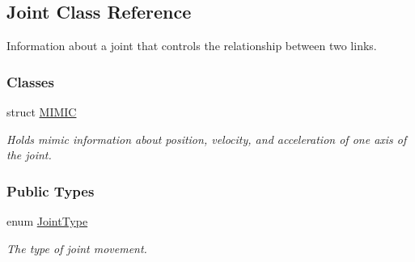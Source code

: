 \hypertarget{classOpenRAVE_1_1KinBody_1_1Joint}{
\subsection{Joint Class Reference}
\label{classOpenRAVE_1_1KinBody_1_1Joint}
}


Information about a joint that controls the relationship between two links.  


\subsubsection*{Classes}
\begin{DoxyCompactItemize}
\item 
struct \hyperlink{structOpenRAVE_1_1KinBody_1_1Joint_1_1MIMIC}{MIMIC}
\begin{DoxyCompactList}\small\item\em Holds mimic information about position, velocity, and acceleration of one axis of the joint. \item\end{DoxyCompactList}\end{DoxyCompactItemize}
\subsubsection*{Public Types}
\begin{DoxyCompactItemize}
\item 
enum \hyperlink{classOpenRAVE_1_1KinBody_1_1Joint_af92f943e3dc4a7d1fb537fa481094fa9}{JointType} 
\begin{DoxyCompactList}\small\item\em The type of joint movement. \item\end{DoxyCompactList}\end{DoxyCompactItemize}
